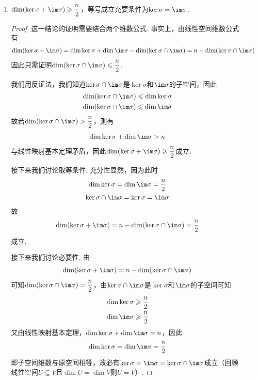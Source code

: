 \begin{enumerate}
    \item $\dim(\ker\sigma+\im \sigma) \geqslant \dfrac{n}{2}$，等号成立充要条件为$\ker\sigma=\im \sigma$.

          \begin{proof}
              这一结论的证明需要结合两个维数公式. 事实上，由线性空间维数公式有
              \[\dim(\ker\sigma+\im \sigma)=\dim\ker\sigma+\dim\im \sigma-\dim(\ker\sigma \cap \im \sigma)=n-\dim(\ker\sigma \cap \im \sigma)\]
              因此只需证明$\dim(\ker\sigma \cap \im \sigma) \leqslant \dfrac{n}{2}$.

              我们用反证法，我们知道$\ker\sigma\cap \im \sigma$是$\ker\sigma$和$\im\sigma$的子空间，因此
              \begin{gather*}
                  \dim(\ker\sigma\cap \im \sigma) \leqslant \dim\ker\sigma \\
                  \dim(\ker\sigma\cap \im \sigma) \leqslant \dim\im\sigma
              \end{gather*}
              故若$\dim(\ker\sigma\cap \im \sigma)>\dfrac{n}{2}$，则有
              \[\dim\ker\sigma+\dim\im \sigma>n\]
              与线性映射基本定理矛盾，因此$\dim(\ker\sigma+\im \sigma) \geqslant \dfrac{n}{2}$成立.

              接下来我们讨论取等条件. 充分性显然，因为此时
              \begin{gather*}
                  \dim\ker\sigma=\dim\im\sigma=\dfrac{n}{2} \\
                  \ker\sigma\cap \im \sigma=\ker\sigma=\im\sigma
              \end{gather*}
              故
              \[\dim(\ker\sigma+\im \sigma)=n-\dim(\ker\sigma \cap \im \sigma)=\dfrac{n}{2}\]
              成立.

              接下来我们讨论必要性. 由
              \[\dim(\ker\sigma+\im \sigma)=n-\dim(\ker\sigma \cap \im \sigma)\]
              可知$\dim(\ker\sigma\cap \im \sigma)=\dfrac{n}{2}$，由$\ker\sigma\cap \im \sigma$是$\ker\sigma$和$\im\sigma$的子空间可知
              \begin{align*}
                  \dim\ker\sigma & \geqslant\dfrac{n}{2} \\
                  \dim\im \sigma & \geqslant\dfrac{n}{2}
              \end{align*}
              又由线性映射基本定理，$\dim\ker\sigma+\dim\im \sigma=n$，因此
              \[\dim\ker\sigma=\dim\im \sigma=\dfrac{n}{2}\]
              即子空间维数与原空间相等，故必有$\ker\sigma=\im \sigma=\ker\sigma\cap \im \sigma$成立（回顾线性空间$U\subseteq V$且$\dim U=\dim V$则$U=V$）.
          \end{proof}
\end{enumerate}

